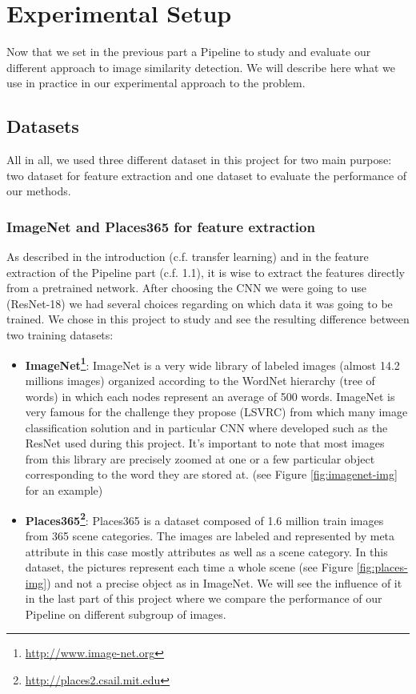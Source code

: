\documentclass[a4paper]{article}
\begin{document}
\section{Experimental Setup}

Now that we set in the previous part a Pipeline to study and evaluate our different approach to image similarity detection. We will describe here what we use in practice in our experimental approach to the problem.

\subsection{Datasets}
All in all, we used three different dataset in this project for two main purpose: two dataset for feature extraction and one dataset to evaluate the performance of our methods.

\subsubsection{ImageNet and Places365 for feature extraction}
As described in the introduction (c.f. transfer learning) and in the feature extraction of the Pipeline part (c.f. 1.1), it is wise to extract the features directly from a pretrained network. After choosing the CNN we were going to use (ResNet-18) we had several choices regarding on which data it was going to be trained. We chose in this project to study and see the resulting difference between two training datasets:
\begin{itemize}
	\item \textbf{ImageNet\footnote{\url{http://www.image-net.org}}}: ImageNet is a very wide library of labeled images (almost 14.2 millions images) organized according to the WordNet hierarchy (tree of words) in which each nodes represent an average of 500 words. ImageNet is very famous for the challenge they propose (LSVRC) from which many image classification solution and in particular CNN where developed such as the ResNet used during this project. It's important to note that most images from this library are precisely zoomed at one or a few particular object corresponding to the word they are stored at. (see Figure \ref{fig:imagenet-img} for an example)
	\item \textbf{Places365\footnote{\url{http://places2.csail.mit.edu}}}: Places365 is a dataset composed of 1.6 million train images from  365 scene categories. The images are labeled and represented by meta attribute in this case mostly attributes as well as a scene category. In this dataset, the pictures represent each time a whole scene (see Figure \ref{fig:places-img}) and not a precise object as in ImageNet. We will see the influence of it in the last part of this project where we compare the performance of our Pipeline on different subgroup of images.
\end{itemize}
\end{document}
